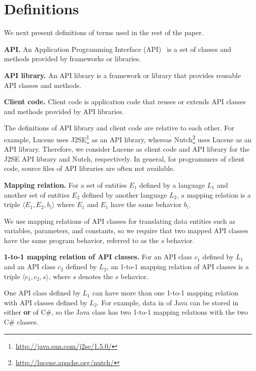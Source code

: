 \section{Definitions}
\label{sec:mapping}

We next present definitions of terms used in the rest of the paper.

\textbf{API.} An Application Programming Interface (API)~\cite{orenstein2000quickstudy}
is a set of classes and methods provided by frameworks or libraries.

\textbf{API library.} An API library is a framework
or library that provides reusable API classes and methods.

\textbf{Client code.} Client code is application code
that reuses or extends API classes and methods provided by API
libraries.

The definitions of API library and client code are relative to each other. For example, Lucene uses
J2SE\footnote{\url{http://java.sun.com/j2se/1.5.0/}} as an API
library, whereas Nutch\footnote{\url{http://lucene.apache.org/nutch/}} uses Lucene as
an API library. Therefore, we consider Lucene as client code and API
library for the J2SE API library and Nutch, respectively. In
general, for programmers of client code, source files of API libraries are often
not available.

\textbf{Mapping relation.} For a set of entities $E_1$ defined by a
language $L_1$ and another set of entities $E_2$ defined by another
language $L_2$, a mapping relation is a triple $\langle E_1, E_2,
b_i \rangle$ where $E_1$ and $E_1$ have the same behavior $b_i$.

We use mapping relations of API classes for translating data entities such as
variables, parameters, and constants, so we require that two mapped
API classes have the same program behavior, referred to as
the $s$ behavior.

\textbf{1-to-1 mapping relation of API classes.} For an API class
$c_1$ defined by $L_1$ and an API class $c_2$ defined by $L_2$, an
1-to-1 mapping relation of API classes is a triple $\langle c_1,
c_2, s \rangle$, where $s$ denotes the $s$ behavior.

One API class defined by $L_1$ can have more than one 1-to-1 mapping
relation with API classes defined by $L_2$. For example, data in
 of Java can be stored in either
 \textbf{or}
 of C\#, so the Java class
has two 1-to-1 mapping relations with the two C\# classes.

